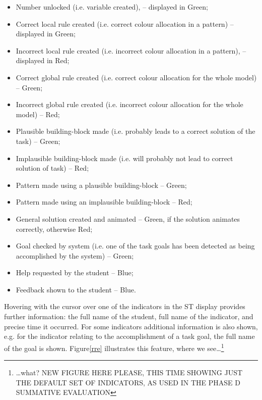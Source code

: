 \begin{itemize}
        	\item Number unlocked (i.e. variable created), – displayed in Green;
        	\item Correct local rule created (i.e. correct colour
              allocation in a pattern) – displayed in Green;
        	\item Incorrect local rule created (i.e. incorrect colour
              allocation in a pattern), – displayed in Red;
        	\item Correct global rule created (i.e. correct colour
              allocation for the whole model) – Green;
        	\item Incorrect global rule created (i.e. incorrect colour
              allocation for the whole model) – Red;
        	\item Plausible building-block made (i.e. probably leads
              to a correct solution of the task) – Green;
        	\item Implausible building-block made (i.e. will probably
              not lead to correct solution of task) – Red;
        	\item Pattern made using a plausible building-block – Green; 
        	\item Pattern made using an implausible building-block –
              Red;
        	\item General solution created and animated – Green, if
              the solution animates correctly, otherwise Red;
        	\item Goal checked by system (i.e. one of the task goals
              has been detected as being accomplished by the system) –
              Green;
        	\item Help requested by the student – Blue; 
        	\item Feedback shown to the student – Blue.
  \end{itemize}
 
Hovering with the cursor over one of the indicators in the ST display
provides further  information: the full name of the student, full name
of the indicator, and precise time it occurred. For some indicators
additional information is also shown, e.g. for the indicator relating
to the accomplishment of a task goal, the full name of the goal is
shown.  Figure\ref{rre} illustrates this feature, where we
see\ldots\footnote{\ldots what?   NEW FIGURE HERE PLEASE, THIS TIME SHOWING JUST THE
  DEFAULT SET OF INDICATORS, AS USED IN THE PHASE D SUMMATIVE
  EVALUATION}

